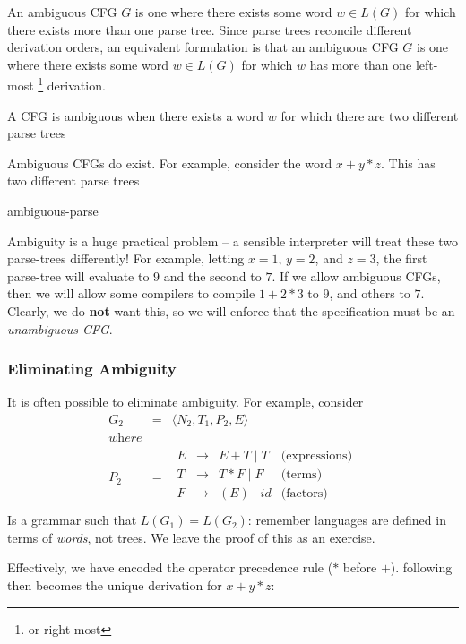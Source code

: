 An ambiguous CFG $G$ is one where there exists some word $w \in L(G)$ for which there exists more than one parse tree. Since parse trees reconcile different derivation orders, an equivalent formulation is that an ambiguous CFG $G$ is one where there exists some word $w \in L(G)$ for which $w$ has more than one left-most \footnote{or right-most} derivation.

\begin{definition}
    A CFG is ambiguous when there exists a word $w$ for which there are two different parse trees
\end{definition}

Ambiguous CFGs do exist. For example, consider the word $x + y * z$. This has two different parse trees

{ambiguous-parse}

Ambiguity is a huge practical problem -- a sensible interpreter will treat these two parse-trees differently! For example, letting $x = 1$, $y = 2$, and $z = 3$, the first parse-tree will evaluate to $9$ and the second to $7$. If we allow ambiguous CFGs, then we will allow some compilers to compile $1 + 2 * 3$ to $9$, and others to $7$. Clearly, we do \textbf{not} want this, so we will enforce that the specification must be an \textit{unambiguous CFG}.

\subsubsection{Eliminating Ambiguity}\label{section:ambiguity-elim}
It is often possible to eliminate ambiguity. For example, consider
\[
\begin{array}{rcll}
G_2 &=& \langle N_2, T_1, P_2, E \rangle\\[1ex]
\textit{where} \\
P_2 &=& \begin{array}{rcll}
E &\to& E + T \mid T & \text{(expressions)}\\
T &\to& T * F \mid F & \text{(terms)}\\
F &\to& (E) \mid id & \text{(factors)}\\
\end{array}
\end{array}
\]
Is a grammar such that $L(G_1) = L(G_2)$: remember languages are defined in terms of \textit{words}, not trees. We leave the proof of this as an exercise.

Effectively, we have encoded the operator precedence rule ($*$ before $+$).  following then becomes the unique derivation for $x + y * z$:

